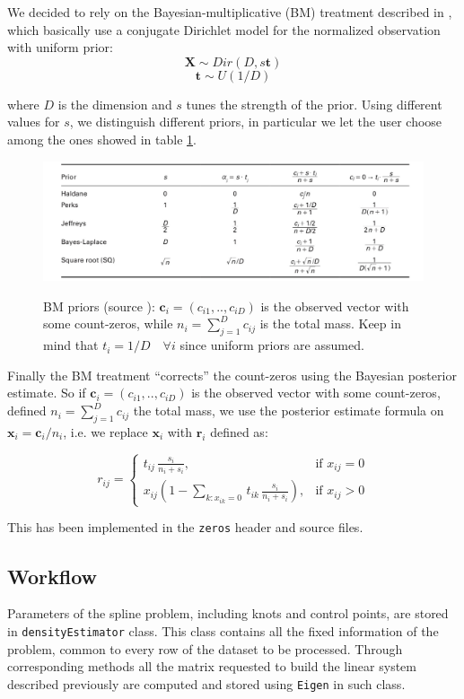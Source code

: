 We decided to rely on the Bayesian-multiplicative (BM) treatment described in \cite{fernandez:zeros}, which basically use a conjugate Dirichlet model for the normalized observation with uniform prior:
\[ \bm{X} \sim Dir(D,s\bm{t}) \]
\[ \bm{t} \sim U(1/D) \]

where $D$ is the dimension and $s$ tunes the strength of the prior. Using different values for $s$, we distinguish different priors, in particular we let the user choose among the ones showed in table \ref{fig:priors}.

\begin{figure}[ht]
	
	
	\includegraphics[width=\textwidth]{./pictures/BM/BMpriors.png}
	\label{fig:priors}
	
	\caption{BM priors (source \cite{fernandez:zeros}): $\bm{c}_{i}=(c_{i1},..,c_{iD})$ is the observed vector with some count-zeros, while $n_{i}=\sum_{j=1}^{D}c_{ij}$ is the total mass. Keep in mind that $t_{i}=1/D \quad \forall i$ since uniform priors are assumed.}
	\label{fig:priors}
	
\end{figure}

Finally the BM treatment ``corrects'' the count-zeros using the Bayesian posterior estimate. So if $\bm{c}_{i}=(c_{i1},..,c_{iD})$ is the observed vector with some count-zeros, defined $n_{i}=\sum_{j=1}^{D}c_{ij}$ the total mass, we use the posterior estimate formula on $\bm{x}_{i}=\bm{c}_{i}/n_{i}$, i.e. we replace $\bm{x}_{i}$ with $\bm{r}_{i}$ defined as:

\[ r_{ij} = 
\begin{cases} 
t_{ij} \, \frac{s_{i}}{n_{i}+s_{i}}, & \mbox{if } x_{ij}=0 \\ 
x_{ij}(1-\sum_{k:x_{ik}=0} \, t_{ik} \, \frac{s_{i}}{n_{i}+s_{i}}), & \mbox{if } x_{ij}>0 
\end{cases} \]

This has been implemented in the \verb|zeros| header and source files.

\subsection{Workflow} \label{workflow}
Parameters of the spline problem, including knots and control points, are stored in \verb|densityEstimator| class. This class contains all the fixed information of the problem, common to every row of the dataset to be processed. Through corresponding methods all the matrix requested to build the linear system described previously are computed and stored using \verb|Eigen| in such class.

